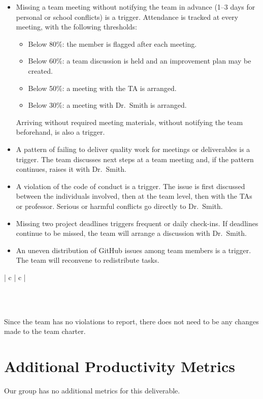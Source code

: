 \documentclass{article}
\begin{document}
\begin{itemize}
    \item[\textbf{Attendance:}] Missing a team meeting without notifying
    the team in advance (1--3 days for personal or school conflicts) is a
    trigger. Attendance is tracked at every meeting, with the following
    thresholds:
    \begin{itemize}
        \item Below 80\%: the member is flagged after each meeting.
        \item Below 60\%: a team discussion is held and an improvement
        plan may be created.
        \item Below 50\%: a meeting with the TA is arranged.
        \item Below 30\%: a meeting with Dr.\ Smith is arranged.
    \end{itemize}
    Arriving without required meeting materials, without notifying the
    team beforehand, is also a trigger.

    \item[\textbf{Quality:}] A pattern of failing to deliver quality work
    for meetings or deliverables is a trigger. The team discusses next
    steps at a team meeting and, if the pattern continues, raises it with
    Dr.\ Smith.

    \item[\textbf{Attitude:}] A violation of the code of conduct is a
    trigger. The issue is first discussed between the individuals
    involved, then at the team level, then with the TAs or professor. Serious
    or harmful conflicts go directly to Dr.\ Smith.

    \item[\textbf{Stay on track:}] Missing two project deadlines triggers
    frequent or daily check-ins. If deadlines continue to be missed, the
    team will arrange a discussion with Dr.\ Smith.

    \item[\textbf{Workload:}] An uneven distribution of GitHub issues
    among team members is a trigger. The team will reconvene to
    redistribute tasks.
\end{itemize}

\begin{longtable}[c]{| c | c |}
\caption{Team Charter Violations.\label{CharterViolations}}\\
    \hline
     \\
     \hline
     \endfirsthead
 \end{longtable}

Since the team has no violations to report, there does not need to be any changes made to the team charter.
 
\section{Additional Productivity Metrics}

Our group has no additional metrics for this deliverable. 
\end{document}
